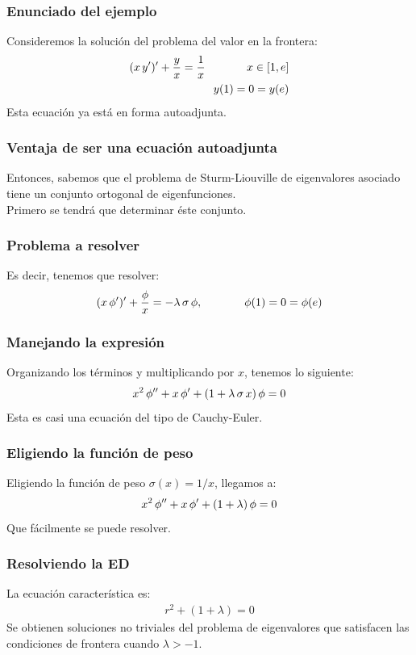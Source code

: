\documentclass[12pt]{beamer}
\begin{document}
\begin{frame}
\frametitle{Enunciado del ejemplo}
Consideremos la solución del problema del valor en la frontera:
\pause
\begin{align}
(x \, {y}^{\prime})^{\prime} + \dfrac{y}{x} = \dfrac{1}{x} \hspace{1.3cm} x \in [1, e] \label{eq:ecuacion_04_24} \\
y (1) = 0 = y (e) \label{eq:ecuacion_04_25}
\end{align}
Esta ecuación ya está en forma autoadjunta.
\end{frame}
\begin{frame}
\frametitle{Ventaja de ser una ecuación autoadjunta}
Entonces, sabemos que el problema de Sturm-Liouville de eigenvalores asociado tiene un conjunto ortogonal de eigenfunciones.
\\
\bigskip
\pause
Primero se tendrá que determinar éste conjunto.
\end{frame}
\begin{frame}
\frametitle{Problema a resolver}
Es decir, tenemos que resolver:
\pause
\begin{align}
(x \, {\phi}^{\prime})^{\prime} + \dfrac{\phi}{x} = -\lambda \, \sigma \, \phi, \hspace{1.3cm} \phi (1) = 0 =\phi (e)
\label{eq:ecuacion_04_26}
\end{align}
\end{frame}
\begin{frame}
\frametitle{Manejando la expresión}
Organizando los términos y multiplicando por $x$, tenemos lo siguiente:
\pause
\begin{align*}
x^{2} \, {\phi}^{\prime \prime} + x \, {\phi}^{\prime} + (1 + \lambda \, \sigma \, x) \, \phi = 0
\end{align*}
Esta es casi una ecuación del tipo de Cauchy-Euler.
\end{frame}
\begin{frame}
\frametitle{Eligiendo la función de peso}
Eligiendo la función de peso $\sigma (x) = 1 / x$, llegamos a:
\pause
\begin{align*}
x^{2} \, {\phi}^{\prime \prime} + x \, {\phi}^{\prime} + (1 + \lambda ) \, \phi = 0
\end{align*}
Que fácilmente se puede resolver.
\end{frame}
\begin{frame}
\frametitle{Resolviendo la ED}
La ecuación característica es:
\pause
\begin{align*}
r^{2} + (1 + \lambda) = 0
\end{align*}
\pause
Se obtienen soluciones no triviales del problema de eigenvalores que satisfacen las condiciones de frontera cuando $\lambda > -1$.
\end{frame}
\end{document}

